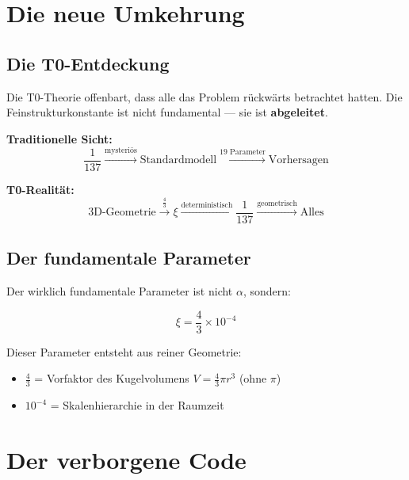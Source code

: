 	\section{Die neue Umkehrung}
	
	\subsection{Die T0-Entdeckung}
	
	Die T0-Theorie offenbart, dass alle das Problem rückwärts betrachtet hatten. Die Feinstrukturkonstante ist nicht fundamental — sie ist \textbf{abgeleitet}.
	
	\begin{tcolorbox}[colback=green!5!white,colframe=green!50!black,title=Der Perspektivwechsel]
		\textbf{Traditionelle Sicht:}
		\begin{equation}
			\frac{1}{137} \xrightarrow{\text{mysteriös}} \text{Standardmodell} \xrightarrow{\text{19 Parameter}} \text{Vorhersagen}
		\end{equation}
		
		\textbf{T0-Realität:}
		\begin{equation}
			\text{3D-Geometrie} \xrightarrow{\frac{4}{3}} \xi \xrightarrow{\text{deterministisch}} \frac{1}{137} \xrightarrow{\text{geometrisch}} \text{Alles}
		\end{equation}
	\end{tcolorbox}
	
	\subsection{Der fundamentale Parameter}
	
	Der wirklich fundamentale Parameter ist nicht $\alpha$, sondern:
	
	\begin{equation}
		\boxed{\xi = \frac{4}{3} \times 10^{-4}}
	\end{equation}
	
	Dieser Parameter entsteht aus reiner Geometrie:
	\begin{itemize}
		\item $\frac{4}{3}$ = Vorfaktor des Kugelvolumens $V = \frac{4}{3}\pi r^3$ (ohne $\pi$)
		\item $10^{-4}$ = Skalenhierarchie in der Raumzeit
	\end{itemize}
	
	\section{Der verborgene Code}
	
